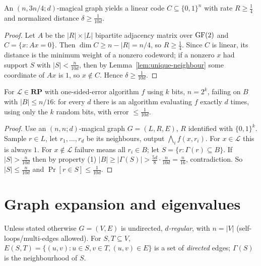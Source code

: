 \begin{theorem}
  \label{thm:magical-code}
  An $(n,3n/4;d)$-magical graph yields a linear code $C\subseteq\{0,1\}^n$ with
  rate $R\ge\tfrac14$ and normalized distance $\delta\ge\tfrac1{10d}$.
\end{theorem}
\begin{proof}
  Let $A$ be the $|R|\times|L|$ bipartite adjacency matrix over $\mathrm{GF}(2)$ and
  $C=\{x:Ax=0\}$. Then $\dim C\ge n-|R|=n/4$, so $R\ge\tfrac14$. Since $C$ is
  linear, its distance is the minimum weight of a nonzero codeword; if a nonzero
  $x$ had support $S$ with $|S|<\tfrac n{10d}$, then by
  Lemma~\ref{lem:unique-neighbour} some coordinate of $Ax$ is $1$, so
  $x\notin C$. Hence $\delta\ge\tfrac1{10d}$.
\end{proof}

\begin{theorem}
  \label{thm:rp-amplification}
  For $\mathcal L\in\mathbf{RP}$ with one-sided-error algorithm $f$ using $k$
  bits, $n=2^k$, failing on $B$ with $|B|\le n/16$: for every $d$ there is an
  algorithm evaluating $f$ exactly $d$ times, using only the $k$ random bits,
  with error $\le\tfrac1{10d}$.
\end{theorem}
\begin{proof}
  Use an $(n,n;d)$-magical graph $G=(L,R,E)$, $R$ identified with $\{0,1\}^k$.
  Sample $r\in L$, let $r_1,\dots,r_d$ be its neighbours, output
  $\bigwedge_i f(x,r_i)$. For $x\in\mathcal L$ this is always $1$. For
  $x\notin\mathcal L$ failure means all $r_i\in B$; let $S=\{r:\Gamma(r)\subseteq
  B\}$. If $|S|>\tfrac n{10d}$ then by property (1)
  $|B|\ge|\Gamma(S)|>\tfrac{5d}8\cdot\tfrac n{10d}=\tfrac n{16}$, contradiction.
  So $|S|\le\tfrac n{10d}$ and $\Pr[r\in S]\le\tfrac1{10d}$.
\end{proof}


\chapter{Graph expansion and eigenvalues}

\begin{definition}
  \label{def:d-regular}
  Unless stated otherwise $G=(V,E)$ is undirected, \emph{$d$-regular}, with
  $n=|V|$ (self-loops/multi-edges allowed). For $S,T\subseteq V$,
  $E(S,T)=\{(u,v):u\in S,v\in T,(u,v)\in E\}$ is a set of \emph{directed} edges;
  $\Gamma(S)$ is the neighbourhood of $S$.
\end{definition}

